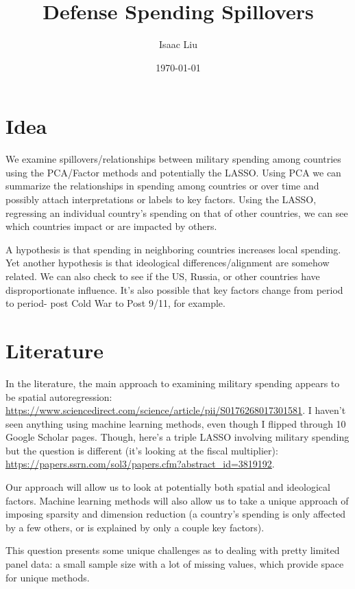 \documentclass{report}
\title{Defense Spending Spillovers}
\author{Isaac Liu}
\date{\today}
\begin{document}
	\maketitle

	\newpage \clearpage

    \section*{Idea}

	We examine spillovers/relationships between military spending among countries using the PCA/Factor methods and potentially the LASSO. Using PCA we can summarize the relationships in spending among countries or over time and possibly attach interpretations or labels to key factors. Using the LASSO, regressing an individual country's spending on that of other countries, we can see which countries impact or are impacted by others.

	A hypothesis is that spending in neighboring countries increases local spending. Yet another hypothesis is that ideological differences/alignment are somehow related. We can also check to see if the US, Russia, or other countries have disproportionate influence. It's also possible that key factors change from period to period- post Cold War to Post 9/11, for example.

    \section*{Literature}

	In the literature, the main approach to examining military spending appears to be spatial autoregression: \url{https://www.sciencedirect.com/science/article/pii/S0176268017301581}. I haven't seen anything using machine learning methods, even though I flipped through 10 Google Scholar pages. Though, here's a triple LASSO involving military spending but the question is different (it's looking at the fiscal multiplier): \url{https://papers.ssrn.com/sol3/papers.cfm?abstract_id=3819192}.

	Our approach will allow us to look at potentially both spatial and ideological factors. Machine learning methods will also allow us to take a unique approach of imposing sparsity and dimension reduction (a country's spending is only affected by a few others, or is explained by only a couple key factors).

	This question presents some unique challenges as to dealing with pretty limited panel data: a small sample size with a lot of missing values, which provide space for unique methods.
\end{document}
